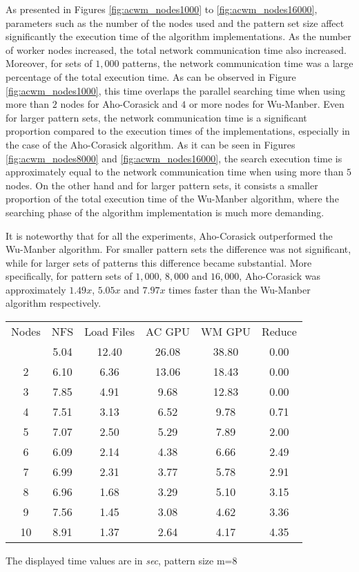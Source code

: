 \documentclass{ws-ijait}
\begin{document}
As presented in Figures \ref{fig:acwm_nodes1000} to \ref{fig:acwm_nodes16000}, parameters such as the number of the nodes used and the pattern set size affect significantly the execution time of the algorithm implementations. As the number of worker nodes increased, the total network communication time also increased. Moreover, for sets of $1,000$ patterns, the network communication time was a large percentage of the total execution time. As can be observed in Figure \ref{fig:acwm_nodes1000}, this time overlaps the parallel searching time when using more than $2$ nodes for Aho-Corasick and $4$ or more nodes for Wu-Manber. Even for larger pattern sets, the network communication time is a significant proportion compared to the execution times of the implementations, especially in the case of the Aho-Corasick algorithm. As it can be seen in Figures \ref{fig:acwm_nodes8000} and \ref{fig:acwm_nodes16000}, the search execution time is approximately equal to the network communication time when using more than $5$ nodes. On the other hand and for larger pattern sets, it consists a smaller proportion of the total execution time of the Wu-Manber algorithm, where the searching phase of the algorithm implementation is much more demanding.

It is noteworthy that for all the experiments, Aho-Corasick outperformed the Wu-Manber algorithm. For smaller pattern sets the difference was not significant, while for larger sets of patterns this difference became substantial. More specifically, for pattern sets of $1,000$, $8,000$ and $16,000$, Aho-Corasick was approximately $1.49x$, $5.05x$ and $7.97x$ times faster than the Wu-Manber algorithm respectively.


\begin{table}[h]
{\begin{tabular}{@{}c |ccccc@{}} \toprule
Nodes & NFS & Load Files & AC GPU & WM GPU & Reduce\\
\colrule
1 & 5.04 & 12.40 & 26.08 & 38.80 & 0.00\\
2 & 6.10 & 6.36 & 13.06 & 18.43 & 0.00\\
3 & 7.85 & 4.91 & 9.68 & 12.83 & 0.00\\
4 & 7.51 & 3.13 & 6.52 & 9.78 & 0.71\\
5 & 7.07 & 2.50 & 5.29 & 7.89 & 2.00\\
6 & 6.09 & 2.14 & 4.38 & 6.66 & 2.49\\
7 & 6.99 & 2.31 & 3.77 & 5.78 & 2.91\\
8 & 6.96 & 1.68 & 3.29 & 5.10 & 3.15\\
9 & 7.56 & 1.45 & 3.08 & 4.62 & 3.36\\
10 & 8.91 & 1.37 & 2.64 & 4.17 & 4.35\\
\hline
\end{tabular}}
\begin{tabnote}
The displayed time values are in \textit{sec}, pattern size m=$8$
\end{tabnote}
\label{tbl:comp-execution-1000}
\end{table}
\end{document}
